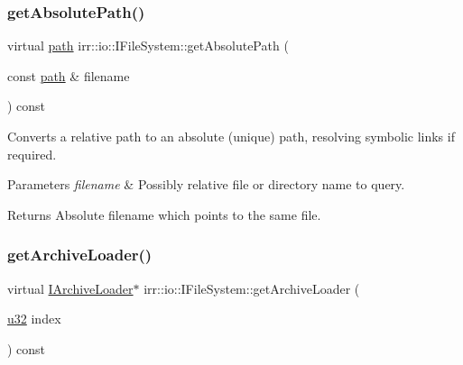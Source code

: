 \subsubsection{\texorpdfstring{get\+Absolute\+Path()}{getAbsolutePath()}\hspace{0.1cm}{\footnotesize\ttfamily [2/2]}}
{\footnotesize\ttfamily virtual \hyperlink{namespaceirr_1_1io_a6468281622ce3a1c46b72e19f32dded5}{path} irr\+::io\+::\+I\+File\+System\+::get\+Absolute\+Path (\begin{DoxyParamCaption}\item[{const \hyperlink{namespaceirr_1_1io_a6468281622ce3a1c46b72e19f32dded5}{path} \&}]{filename }\end{DoxyParamCaption}) const\hspace{0.3cm}{\ttfamily [pure virtual]}}



Converts a relative path to an absolute (unique) path, resolving symbolic links if required. 


\begin{DoxyParams}{Parameters}
{\em filename} & Possibly relative file or directory name to query. \\
\hline
\end{DoxyParams}
\begin{DoxyReturn}{Returns}
Absolute filename which points to the same file. 
\end{DoxyReturn}
\mbox{\label{classirr_1_1io_1_1IFileSystem_a175208d74556d1a0e4fe7400bbc65d7b}} 
\subsubsection{\texorpdfstring{get\+Archive\+Loader()}{getArchiveLoader()}\hspace{0.1cm}{\footnotesize\ttfamily [1/2]}}
{\footnotesize\ttfamily virtual \hyperlink{classirr_1_1io_1_1IArchiveLoader}{I\+Archive\+Loader}$\ast$ irr\+::io\+::\+I\+File\+System\+::get\+Archive\+Loader (\begin{DoxyParamCaption}\item[{\hyperlink{namespaceirr_a0416a53257075833e7002efd0a18e804}{u32}}]{index }\end{DoxyParamCaption}) const\hspace{0.3cm}{\ttfamily [pure virtual]}}



